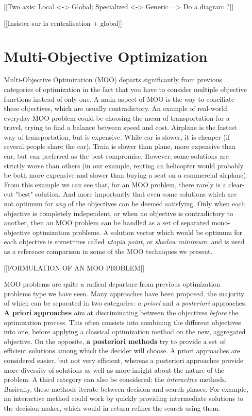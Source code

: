 [[Two axis: Local <-> Global; Specialized <-> Generic => Do a diagram ?]]

[[Insister sur la centralisation + global]]

\chapter{Multi-Objective Optimization}

Multi-Objective Optimization (MOO) departs significantly from previous categories of optimization in the fact that you have to consider multiple objective functions instead of only one. A main aspect of MOO is the way to conciliate these objectives, which are usually contradictory.
An example of real-world everyday MOO problem could be choosing the mean of transportation for a travel, trying to find a balance between speed and cost. Airplane is the fastest way of transportation, but is expensive. While car is slower, it is cheaper (if several people share the car). Train is slower than plane, more expensive than car, but can preferred as the best compromise. However, some solutions are strictly worse than others (in our example, renting an helicopter would probably be both more expensive and slower than buying a seat on a commercial airplane).
From this example we can see that, for an MOO problem, there rarely is a clear-cut "best" solution. And more importantly that even some solutions which are not optimum for \emph{any} of the objectives can be deemed satisfying. Only when each objective is completely independent, or when no objective is contradictory to another, then an MOO problem can be handled as a set of separated mono-objective optimization problems.
A solution vector which would be optimum for each objective is sometimes called \emph{utopia point}, or \emph{shadow minimum}, and is used as a reference comparison in some of the MOO techniques we present.

[[FORMULATION OF AN MOO PROBLEM]]

MOO problems are quite a radical departure from previous optimization problems type we have seen. Many approaches have been proposed, the majority of which can be separated in two categories: \emph{a priori} and \emph{a posteriori} approaches. \textbf{A priori approaches} aim at discriminating between the objectives \emph{before} the optimization process. This often consists into combining the different objectives into one, before applying a classical optimization method on the new, aggregated objective.
On the opposite, \textbf{a posteriori methods} try to provide a set of efficient solutions among which the decider will choose.
A priori approaches are considered easier, but not very efficient, whereas a posteriori approaches provide more diversity of solutions as well as more insight about the nature of the problem.
A third category can also be considered: the \emph{interactive} methods. Basically, these methods iterate between decision and search phases. For example, an interactive  method could work by quickly providing intermediate solutions to the decision-maker, which would in return refines the search using them.

